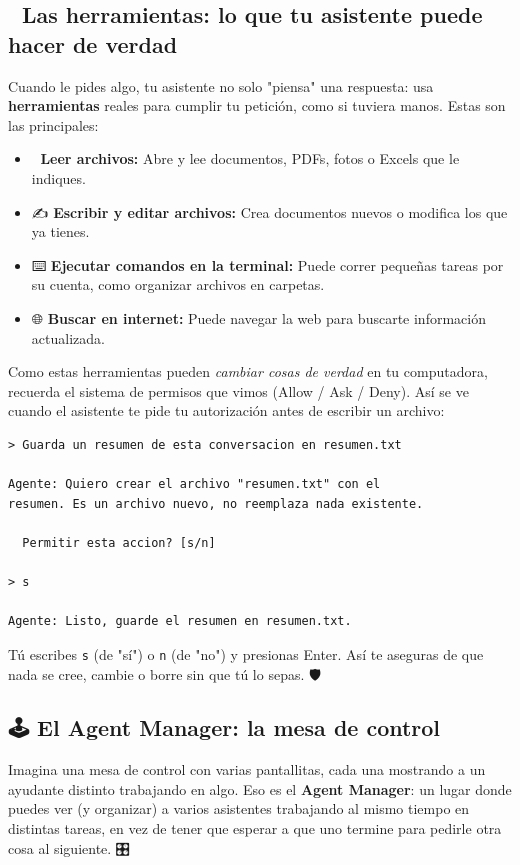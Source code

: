 \documentclass[12pt]{article}
\begin{document}
\subsection{🧰 Las herramientas: lo que tu asistente puede hacer de verdad}
Cuando le pides algo, tu asistente no solo "piensa" una respuesta: usa \textbf{herramientas} reales para cumplir tu petición, como si tuviera manos. Estas son las principales:

\begin{itemize}
    \item 📖 \textbf{Leer archivos:} Abre y lee documentos, PDFs, fotos o Excels que le indiques.
    \item ✍️ \textbf{Escribir y editar archivos:} Crea documentos nuevos o modifica los que ya tienes.
    \item ⌨️ \textbf{Ejecutar comandos en la terminal:} Puede correr pequeñas tareas por su cuenta, como organizar archivos en carpetas.
    \item 🌐 \textbf{Buscar en internet:} Puede navegar la web para buscarte información actualizada.
\end{itemize}

Como estas herramientas pueden \textit{cambiar cosas de verdad} en tu computadora, recuerda el sistema de permisos que vimos (Allow / Ask / Deny). Así se ve cuando el asistente te pide tu autorización antes de escribir un archivo:

\begin{verbatim}
> Guarda un resumen de esta conversacion en resumen.txt

Agente: Quiero crear el archivo "resumen.txt" con el
resumen. Es un archivo nuevo, no reemplaza nada existente.

  Permitir esta accion? [s/n]

> s

Agente: Listo, guarde el resumen en resumen.txt.
\end{verbatim}

Tú escribes \texttt{s} (de "sí") o \texttt{n} (de "no") y presionas Enter. Así te aseguras de que nada se cree, cambie o borre sin que tú lo sepas. 🛡️

\subsection{🕹️ El Agent Manager: la mesa de control}
Imagina una mesa de control con varias pantallitas, cada una mostrando a un ayudante distinto trabajando en algo. Eso es el \textbf{Agent Manager}: un lugar donde puedes ver (y organizar) a varios asistentes trabajando al mismo tiempo en distintas tareas, en vez de tener que esperar a que uno termine para pedirle otra cosa al siguiente. 🎛️
\end{document}
